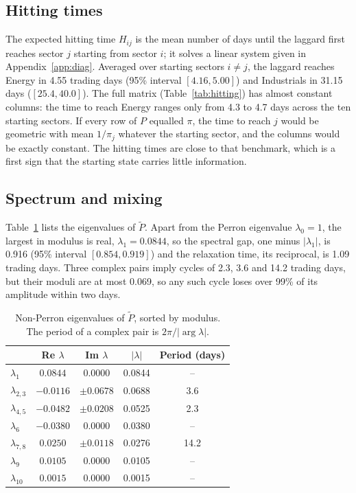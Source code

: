 \documentclass[11pt]{article}
\begin{document}
\subsection{Hitting times}

The expected hitting time $H_{ij}$ is the mean number of days until the laggard first reaches sector $j$ starting from sector $i$; it solves a linear system given in Appendix~\ref{app:diag}. Averaged over starting sectors $i \neq j$, the laggard reaches Energy in 4.55 trading days (95\% interval $[4.16, 5.00]$) and Industrials in 31.15 days ($[25.4, 40.0]$). The full matrix (Table~\ref{tab:hitting}) has almost constant columns: the time to reach Energy ranges only from 4.3 to 4.7 days across the ten starting sectors. If every row of $P$ equalled $\pi$, the time to reach $j$ would be geometric with mean $1/\pi_j$ whatever the starting sector, and the columns would be exactly constant. The hitting times are close to that benchmark, which is a first sign that the starting state carries little information.

\subsection{Spectrum and mixing}

Table~\ref{tab:eig} lists the eigenvalues of $\tilde P$. Apart from the Perron eigenvalue $\lambda_0 = 1$, the largest in modulus is real, $\lambda_1 = 0.0844$, so the spectral gap, one minus $|\lambda_1|$, is 0.916 (95\% interval $[0.854, 0.919]$) and the relaxation time, its reciprocal, is 1.09 trading days. Three complex pairs imply cycles of 2.3, 3.6 and 14.2 trading days, but their moduli are at most 0.069, so any such cycle loses over 99\% of its amplitude within two days.

\begin{table}[htbp]\centering
\caption{Non-Perron eigenvalues of $\tilde P$, sorted by modulus. The period of a complex pair is $2\pi/|\arg\lambda|$.}
\label{tab:eig}
\begin{tabular}{lcccc}
\toprule
 & Re $\lambda$ & Im $\lambda$ & $|\lambda|$ & Period (days) \\
\midrule
$\lambda_1$ & $0.0844$ & $0.0000$ & 0.0844 & -- \\
$\lambda_{2,3}$ & $-0.0116$ & $\pm 0.0678$ & 0.0688 & 3.6 \\
$\lambda_{4,5}$ & $-0.0482$ & $\pm 0.0208$ & 0.0525 & 2.3 \\
$\lambda_6$ & $-0.0380$ & $0.0000$ & 0.0380 & -- \\
$\lambda_{7,8}$ & $0.0250$ & $\pm 0.0118$ & 0.0276 & 14.2 \\
$\lambda_9$ & $0.0105$ & $0.0000$ & 0.0105 & -- \\
$\lambda_{10}$ & $0.0015$ & $0.0000$ & 0.0015 & -- \\
\bottomrule
\end{tabular}
\end{table}
\end{document}
